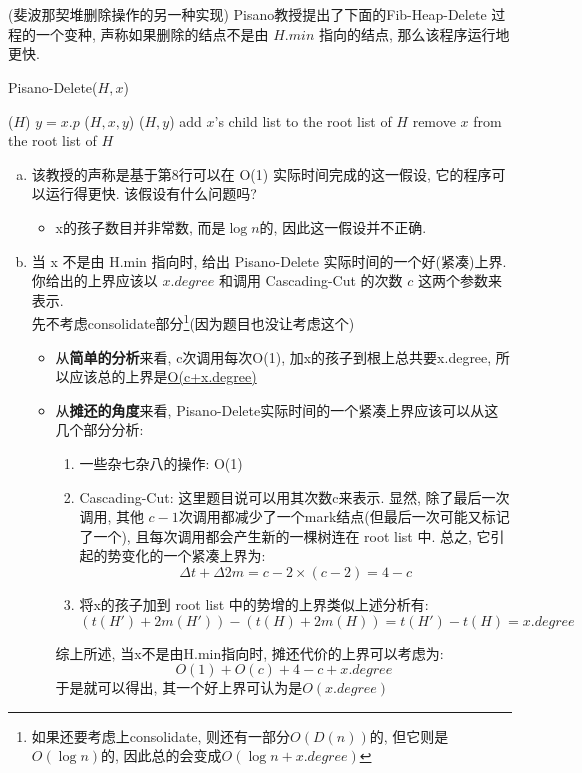 \documentclass[UTF8]{article}
\begin{document}
\section{}
\noindent (斐波那契堆删除操作的另一种实现) Pisano教授提出了下面的{\sc Fib-Heap-Delete} 过程的一个变种, 声称如果删除的结点不是由 $H.min$ 指向的结点, 那么该程序运行地更快.
\begin{algorithm}[H]
	\caption{{\sc Pisano-Delete}($H,x$)}
	\begin{algorithmic}[1] %
			($H$)
		\Else
			\State $y=x.p$
					($H,x,y$)
					($H,y$)
				\EndIf
			\State add $x$'s child list to the root list of $H$
			\State remove $x$ from the root list of $H$
		\EndIf
	\end{algorithmic}
\end{algorithm}
\begin{enumerate}[(a).]
	\item 该教授的声称是基于第8行可以在 O(1) 实际时间完成的这一假设, 它的程序可以运行得更快. 该假设有什么问题吗?\\
	\begin{itemize}
		\item x的孩子数目并非常数, 而是$\log n$的, 因此这一假设并不正确.
	\end{itemize}
	\item 当 x 不是由 H.min 指向时, 给出 {\sc Pisano-Delete} 实际时间的一个好(紧凑)上界. 你给出的上界应该以 $x.degree$ 和调用 {\sc Cascading-Cut} 的次数 $c$ 这两个参数来表示.\\
	先不考虑consolidate部分\footnote{如果还要考虑上consolidate, 则还有一部分$O(D(n))$的, 但它则是$O(\log n)$的, 因此总的会变成$O(\log n+x.degree)$}(因为题目也没让考虑这个)
	\begin{itemize}
		\item 从\textbf{简单的分析}来看, c次调用每次O(1), 加x的孩子到根上总共要x.degree, 所以应该总的上界是\underline{O(c+x.degree)}
		\item 从\textbf{摊还的角度}来看, {\sc Pisano-Delete}实际时间的一个紧凑上界应该可以从这几个部分分析:
		\begin{enumerate}[(1). ]
			\item 一些杂七杂八的操作: O(1)
			\item {\sc Cascading-Cut}: 这里题目说可以用其次数c来表示. 显然, 除了最后一次调用, 其他 $c-1$次调用都减少了一个mark结点(但最后一次可能又标记了一个), 且每次调用都会产生新的一棵树连在 root list 中. 总之, 它引起的势变化的一个紧凑上界为:
			$$\Delta t + \Delta 2m=c-2\times(c-2)=4-c$$
			\item 将x的孩子加到 root list 中的势增的上界类似上述分析有:
			$$(t(H') + 2m(H')) - (t(H) + 2m(H))=t(H')-t(H)=x.degree$$
		\end{enumerate}
		综上所述, 当x不是由H.min指向时, 摊还代价的上界可以考虑为:
		$$O(1)+O(c)+4-c+x.degree$$
		于是就可以得出, 其一个好上界可认为是\underline{$O(x.degree)$}
	\end{itemize}
	
\end{enumerate}
\end{document}
